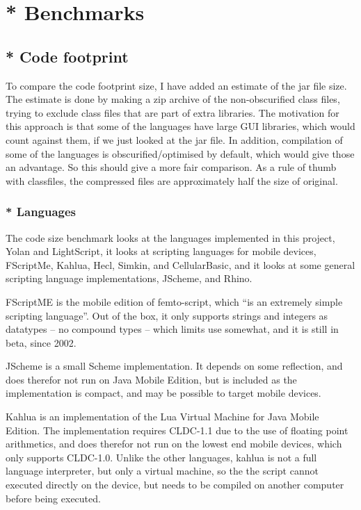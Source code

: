 \chapter{* Benchmarks}
\label{benchmark}

\section{* Code footprint}
To compare the code footprint size, I have added an estimate of the jar file size. 
The estimate is done by making a zip archive of the non-obscurified class files,
trying to exclude class files that are part of extra libraries.
The motivation for this approach is that some of the languages have large GUI libraries,
which would count against them, if we just looked at the jar file. 
In addition, compilation of some of the languages is obscurified/optimised by default,
which would give those an advantage. So this should give a more fair comparison.
As a rule of thumb with classfiles, the compressed files are approximately half the size of original.
\subsection{* Languages}
\label{codefootprint-languages}
The code size benchmark looks at the languages implemented in this project, Yolan and LightScript, it looks at scripting languages for mobile devices, FScriptMe, Kahlua, Hecl, Simkin, and CellularBasic, and it looks at some general scripting language implementations,  JScheme, and Rhino.

FScriptME\cite{fscriptme} is the mobile edition of femto-script, which ``is an extremely simple scripting language''\cite{fscript}. 
Out of the box, it only supports strings and integers as datatypes -- no compound types -- which limits use somewhat, and it is still in beta, since 2002. 

JScheme\cite{jscheme} is a small Scheme implementation. It depends on some reflection, and does therefor not run on Java Mobile Edition, but is included as the implementation is compact, and may be possible to target mobile devices.

Kahlua\cite{kahlua} is an implementation of the Lua Virtual Machine for Java Mobile Edition. 
The implementation requires CLDC-1.1 due to the use of floating point arithmetics, and does therefor not run on the lowest end mobile devices, which only supports CLDC-1.0.
Unlike the other languages, kahlua is not a full language interpreter, but only a virtual machine, so the the script cannot executed directly on the device, but needs to be compiled on another computer before being executed.

